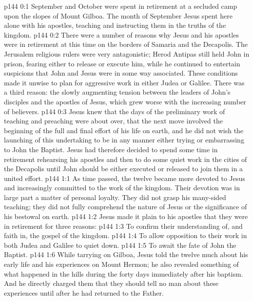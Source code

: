 \author{Midwayer Commission}
\vs p144 0:1 September and October were spent in retirement at a secluded camp upon the slopes of Mount Gilboa. The month of September Jesus spent here alone with his apostles, teaching and instructing them in the truths of the kingdom.
\vs p144 0:2 There were a number of reasons why Jesus and his apostles were in retirement at this time on the borders of Samaria and the Decapolis. The Jerusalem religious rulers were very antagonistic; Herod Antipas still held John in prison, fearing either to release or execute him, while he continued to entertain suspicions that John and Jesus were in some way associated. These conditions made it unwise to plan for aggressive work in either Judea or Galilee. There was a third reason: the slowly augmenting tension between the leaders of John’s disciples and the apostles of Jesus, which grew worse with the increasing number of believers.
\vs p144 0:3 Jesus knew that the days of the preliminary work of teaching and preaching were about over, that the next move involved the beginning of the full and final effort of his life on earth, and he did not wish the launching of this undertaking to be in any manner either trying or embarrassing to John the Baptist. Jesus had therefore decided to spend some time in retirement rehearsing his apostles and then to do some quiet work in the cities of the Decapolis until John should be either executed or released to join them in a united effort.\plusone
{}
\vs p144 1:1 As time passed, the twelve became more devoted to Jesus and increasingly committed to the work of the kingdom. Their devotion was in large part a matter of personal loyalty. They did not grasp his many\hyp{}sided teaching; they did not fully comprehend the nature of Jesus or the significance of his bestowal on earth.
\vs p144 1:2 Jesus made it plain to his apostles that they were in retirement for three reasons:
\pc \vs p144 1:3 \bibnobreakspace To confirm their understanding of, and faith in, the gospel of the kingdom.
\vs p144 1:4 \bibnobreakspace To allow opposition to their work in both Judea and Galilee to quiet down.
\vs p144 1:5 \bibnobreakspace To await the fate of John the Baptist.
\pc \vs p144 1:6 While tarrying on Gilboa, Jesus told the twelve much about his early life and his experiences on Mount Hermon; he also revealed something of what happened in the hills during the forty days immediately after his baptism. And he directly charged them that they should tell no man about these experiences until after he had returned to the Father.
